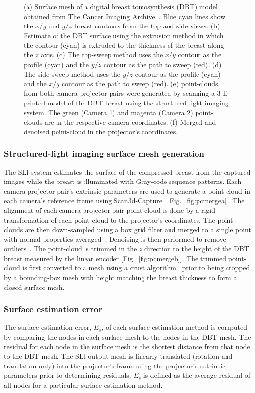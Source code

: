 \begin{figure}
\begin{center}
	\end{center}
	\caption{(a) Surface mesh of a digital breast tomosynthesis (DBT) model obtained from The Cancer Imaging Archive~\cite{Clark2013}. Blue cyan lines show the $x/y$ and $y/z$ breast contours from the top and side views. (b) Estimate of the DBT surface using the extrusion method in which the contour (cyan) is extruded to the thickness of the breast along the $z$ axis. (c) The top-sweep method uses the $x/y$ contour as the profile (cyan) and the $y/z$ contour as the path to sweep (red). (d) The side-sweep method uses the $y/z$ contour as the profile (cyan) and the $x/y$ contour as the path to sweep (red). (e) point-clouds from both camera-projector pairs were generated by scanning a 3-D printed model of the DBT breast using the structured-light imaging system. The green (Camera 1) and magenta (Camera 2) point-clouds are in the respective camera coordinates. (f) Merged and denoised point-cloud in the projector's coordinates.} 
	\label{fig:meshes}
\end{figure} 

\subsubsection{Structured-light imaging surface mesh generation}
The \ac{SLI} system estimates the surface of the compressed breast from the captured images while the breast is illuminated with Gray-code sequence patterns. Each camera-projector pair's extrinsic parameters are used to generate a point-cloud in each camera's reference frame using Scan3d-Capture~\cite{Moreno2012a} [Fig.~\ref{fig:pcmergea}]. The alignment of each camera-projector pair point-cloud is done by a rigid transformation of each point-cloud to the projector's coordinates. The point-clouds are then down-sampled using a box grid filter and merged to a single point with normal properties averaged~\cite{Pomerleau2013}. Denoising is then performed to remove outliers~\cite{Rusu2008}. The point-cloud is trimmed in the $z$ direction to the height of the \ac{DBT} breast measured by the linear encoder [Fig.~\ref{fig:pcmergeb}]. The trimmed point-cloud is first converted to a mesh using a crust algorithm~\cite{Crust1999} prior to being cropped by a bounding-box mesh with height matching the breast thickness to form a closed surface mesh. 

\subsubsection{Surface estimation error}
The surface estimation error, $E_s$, of each surface estimation method is computed by comparing the nodes in each surface mesh to the nodes in the \ac{DBT} mesh. The residual for each node in the surface mesh is the shortest distance from that node to the \ac{DBT} mesh. The \ac{SLI} output mesh is linearly translated (rotation and translation only) into the projector's frame using the projector's extrinsic parameters prior to determining residuals. $E_s$ is defined as the average residual of all nodes for a particular surface estimation method. 

